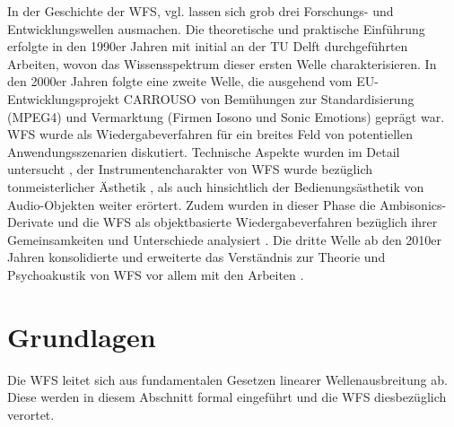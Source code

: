 In der Geschichte der WFS, vgl. \cite{Vries2009_Mono,Vries2019}
lassen sich grob drei Forschungs- und Entwicklungswellen ausmachen.
%
Die theoretische und praktische Einführung erfolgte in den 1990er Jahren
mit initial an der TU Delft durchgeführten
Arbeiten, wovon
\cite{Berkhout1993_JASA,Vogel1993_diss,Boone1995_JAES,Vries1996_JAES,Start1997_diss,Verheijen1997_diss,Sonke2000_diss}
das Wissensspektrum dieser ersten Welle charakterisieren.
%
In den 2000er Jahren folgte eine zweite Welle, die ausgehend vom
EU-Entwicklungsprojekt CARROUSO \cite{Brix2001}
von Bemühungen zur Standardisierung (MPEG4) \cite{Plogsties2003}
und Vermarktung
(Firmen Iosono und Sonic Emotions) geprägt war.
%
WFS wurde als Wiedergabeverfahren für ein breites Feld von potentiellen
Anwendungsszenarien \cite{Sporer2004a, Theile2003}
diskutiert.
%
Technische Aspekte wurden im Detail untersucht \cite{Apel2004,Hulsebos2004_diss,Spors2007b,Corteel2006_JAES,Gauthier2007_JAES,Melchior2008,Franck2008,Salvador2010},
der Instrumentencharakter von WFS wurde bezüglich tonmeisterlicher
Ästhetik \cite{Theile2003,Kuhn2003,Wittek2007_JAES,Wittek2007_diss}, als auch
hinsichtlich der Bedienungsästhetik von Audio-Objekten \cite{Melchior2003,Vaananen2003,Pellegrini2004,Baalman2008_diss}
weiter erörtert.
%
Zudem wurden in dieser Phase die Ambisonics-Derivate
und die WFS
als objektbasierte Wiedergabeverfahren
bezüglich ihrer Gemeinsamkeiten und Unterschiede
analysiert \cite{Nicol1999,Daniel2003,Gauthier2006_JASA,Spors2008b,Ahrens2010_IEEE,Fazi2010}.
%
Die dritte Welle ab den 2010er Jahren konsolidierte und erweiterte das Verständnis
zur Theorie und Psychoakustik von
WFS vor allem mit den Arbeiten \cite{Spors2010a,Voelk2012,Zotter2013,Rohr2013_JAES,Wierstorf2014_diss,Firtha2019_diss,Winter2019_diss,Erbes2020_diss,Hahn2022_JAES}.



\section{Grundlagen}
\label{sec:WFSFundamentals}
%
Die WFS leitet sich aus fundamentalen Gesetzen linearer Wellenausbreitung ab.
%
Diese werden in diesem Abschnitt formal eingeführt und die WFS diesbezüglich
verortet.



